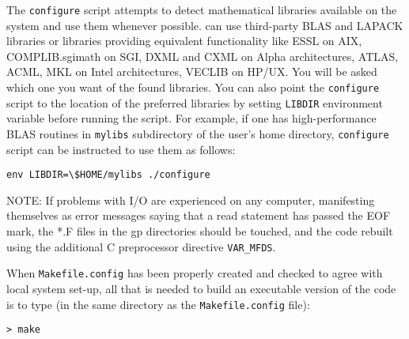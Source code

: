 The \verb|configure| script attempts to detect mathematical libraries
available on the system and use them whenever possible. {\dalton} can
use third-party BLAS and LAPACK libraries or libraries providing
equivalent functionality like ESSL on AIX, COMPLIB.sgimath on SGI,
DXML and CXML on Alpha architectures, ATLAS, ACML, MKL on Intel
architectures, VECLIB on HP/UX.
You will be asked which one you want of the found libraries.
You can also point the \verb|configure|
script to the location of the preferred libraries by setting
\verb|LIBDIR| environment variable before running the script. For
example, if one has high-performance BLAS routines in \verb|mylibs|
subdirectory of the user's home directory, \verb|configure| script can
be instructed to use them as follows:
\begin{verbatim}
env LIBDIR=\$HOME/mylibs ./configure
\end{verbatim}


NOTE: If problems with I/O are experienced on
any computer,
manifesting themselves as error messages saying that a read statement
has passed the EOF mark, the *.F files in the gp directories should be
touched, and the code rebuilt using the additional C preprocessor
directive \verb|VAR_MFDS|.

When  \verb|Makefile.config| has been properly
created and checked
to agree with local system set-up, all that is needed
to build an executable version of the
code is to type
(in the same directory as the \verb|Makefile.config| file):
\begin{verbatim}
> make
\end{verbatim}
%

